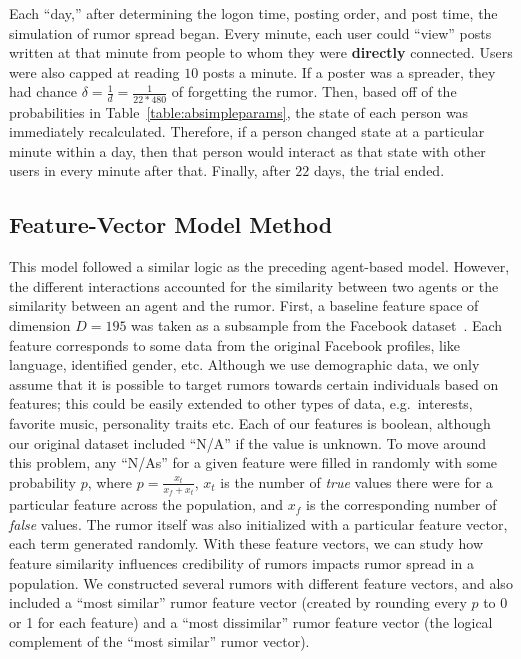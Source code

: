 Each ``day,'' after determining the logon time, posting order, and post time, the simulation of rumor spread began.
Every minute, each user could ``view'' posts written at that minute from people to whom they were \textbf{directly} connected.
Users were also capped at reading $ 10 $ posts a minute.
If a poster was a spreader, they had chance $ \delta = \frac{1}{d} = \frac{1}{22*480} $ of forgetting the rumor.
Then, based off of the probabilities in Table~\ref{table:absimpleparams}, the state of each person was immediately recalculated.
Therefore, if a person changed state at a particular minute within a day, then that person would interact as that state with other users in every minute after that.
Finally, after $ 22 $ days, the trial ended.

\subsection{Feature-Vector Model Method}
\label{subsec:fvmodelsetup}

This model followed a similar logic as the preceding agent-based model.
However, the different interactions accounted for the similarity between two agents or the similarity between an agent and the rumor.
First, a baseline feature space of dimension $ D = 195 $ was taken as a subsample from the Facebook dataset~\cite{mcauley-2014}.
Each feature corresponds to some data from the original Facebook profiles, like language, identified gender, etc.
Although we use demographic data, we only assume that it is possible to target rumors towards certain individuals based on features; this could be easily extended to other types of data, e.g.\ interests, favorite music, personality traits etc.
Each of our features is boolean, although our original dataset included ``N/A'' if the value is unknown.
To move around this problem, any ``N/As'' for a given feature were filled in randomly with some probability $ p $, where $ p = \frac{x_{t}}{x_{f} + x_{t}} $, $ x_{t} $ is the number of \textit{true} values there were for a particular feature across the population, and $ x_{f} $ is the corresponding number of \textit{false} values.
The rumor itself was also initialized with a particular feature vector, each term generated randomly.
With these feature vectors, we can study how feature similarity influences credibility of rumors impacts rumor spread in a population.
We constructed several rumors with different feature vectors, and also included a ``most similar'' rumor feature vector (created by rounding every $ p $ to 0 or 1 for each feature) and a ``most dissimilar'' rumor feature vector (the logical complement of the ``most similar'' rumor vector).


